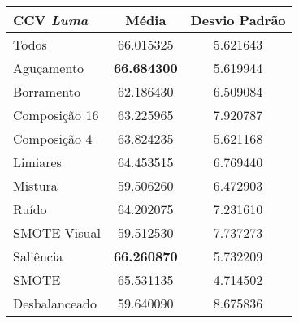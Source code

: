 
\begin{table}[!htbp]
\centering
\caption{}
\label{tab:resultados:x:melhor}
\begin{tabular}{|l|c|c|}
\hline
\textbf{CCV \emph{Luma}} & \textbf{Média}     & \textbf{Desvio Padrão} \\ \hline

   Todos        & 66.015325 & 5.621643  \\ \hline
  Aguçamento    & \textbf{66.684300} & 5.619944  \\ \hline
  Borramento    & 62.186430 & 6.509084  \\ \hline
  Composição 16 & 63.225965 & 7.920787  \\ \hline
  Composição 4  & 63.824235 & 5.621168  \\ \hline
  Limiares      & 64.453515 & 6.769440  \\ \hline
  Mistura       & 59.506260 & 6.472903  \\ \hline
  Ruído         & 64.202075 & 7.231610  \\ \hline
  SMOTE Visual  & 59.512530 & 7.737273  \\ \hline
  Saliência     & \textbf{66.260870} & 5.732209  \\ \hline
 SMOTE          & 65.531135 & 4.714502  \\ \hline
Desbalanceado   & 59.640090 & 8.675836  \\ \hline

\end{tabular}
\end{table}

